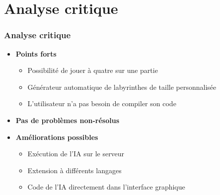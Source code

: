 \section{Analyse critique}

	\begin{frame}
		\frametitle{Analyse critique}

		\begin{itemize}
		\item \textbf{Points forts}
			\begin{itemize}
				\item Possibilité de jouer à quatre sur une partie
				\item Générateur automatique de labyrinthes de taille personnalisée
				\item L'utilisateur n'a pas besoin de compiler son code
			\end{itemize}
		\vspace{10px}
		\item \textbf{Pas de problèmes non-résolus}
		\vspace{10px}
		\item \textbf{Améliorations possibles}
			\begin{itemize}
				\item Exécution de l'IA sur le serveur
				\item Extension à différents langages
				\item Code de l'IA directement dans l'interface graphique
			\end{itemize}
		\end{itemize}
	\end{frame}
